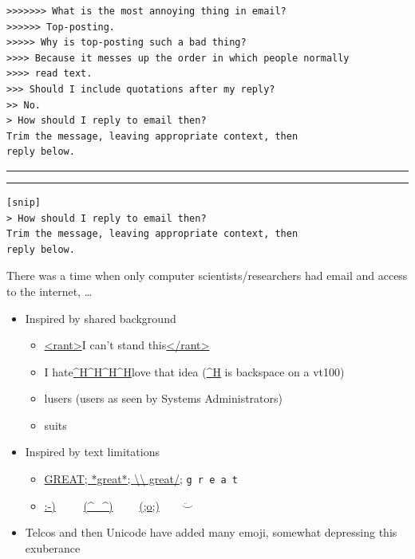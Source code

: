 \documentclass[a4paper,landscape,headrule,footrule,xetex]{foils}
\begin{document}
\begin{verbatim}
>>>>>>> What is the most annoying thing in email?
>>>>>> Top-posting.
>>>>> Why is top-posting such a bad thing?
>>>> Because it messes up the order in which people normally 
>>>> read text.
>>> Should I include quotations after my reply?
>> No.
> How should I reply to email then?
Trim the message, leaving appropriate context, then 
reply below.
\end{verbatim}
\hrule \hrule
\begin{verbatim}
[snip]
> How should I reply to email then?
Trim the message, leaving appropriate context, then  
reply below.
\end{verbatim}







\begin{quote}
\end{quote}

There was a time when only computer scientists/researchers had email
and access to the internet, \ldots

\begin{itemize}
\item Inspired by shared background
  \begin{itemize}
  \item \url{<rant>}I can't stand this\url{</rant>}
  \item I hate\url{^H^H^H^H}love that idea \hfill (\url{^H} is backspace on a vt100)
  \item lusers (users as seen by Systems Administrators)
  \item suits
  \end{itemize}
\item Inspired by text limitations
  \begin{itemize}
  \item \url{GREAT; *great*; \\
great/;} \texttt{g\ r\ e\ a\ t}
  \item \url{:-)}\ \ \ \ \ \url{(^_^)} \ \ \ \  \url{(;o;)}\ \ \ \ $\ddot\smile$
  \end{itemize}
\item Telcos and then Unicode have added many emoji, somewhat
  depressing this exuberance
\end{itemize}
\end{document}
